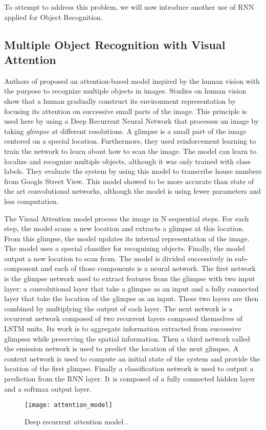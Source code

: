 \documentclass[11pt]{sdm}
\begin{document}
To attempt to address this problem, we will now introduce another use of RNN applied for Object Recognition.

\subsection{Multiple Object Recognition with Visual Attention}

Authors of \cite{ba_multiple_2014} proposed an attention-based model inspired by the human vision with the purpose to recognize multiple objects in images.
Studies on human vision show that a human gradually construct its environment representation by focusing its attention on successive small parts of the image.
This principle is used here by using a Deep Recurrent Neural Network that processes an image by taking \textit{glimpse} at different resolutions.
A glimpse is a small part of the image centered on a special location.
Furthermore, they used reinforcement learning to train the network to learn about how to scan the image.
The model can learn to localize and recognize multiple objects, although it was only trained with class labels.
They evaluate the system by using this model to transcribe house numbers from Google Street View.
This model showed to be more accurate than state of the art convolutional networks, although the model is using fewer parameters and less computation.

The Visual Attention model process the image in N sequential steps.
For each step, the model scans a new location and extracts a glimpse at this location.
From this glimpse, the model updates its internal representation of the image.
The model uses a special classifier for recognizing objects.
Finally, the model output a new location to scan from.
The model is divided successively in sub-component and each of those components is a neural network.
The first network is the glimpse network used to extract features from the glimpse with two input layer: a convolutional layer that take a glimpse as an input and a fully connected layer that take the location of the glimpse as an input.
These two layers are then combined by multiplying the output of each layer.
The next network is a recurrent network composed of two recurrent layers composed themselves of LSTM units.
Its work is to aggregate information extracted from successive glimpses while preserving the spatial information.
Then a third network called the emission network is used to predict the location of the next glimpse.
A context network is used to compute an initial state of the system and provide the location of the first glimpse.
Finally a classification network is used to output a prediction from the RNN layer.
It is composed of a fully connected hidden layer and a softmax output layer.
\begin{figure}[bp]
  \centering
  \texttt{[image: attention\_model]}
  \caption{\label{attention_model} Deep recurrent attention model \cite{ba_multiple_2014}. }
\end{figure}
\end{document}
